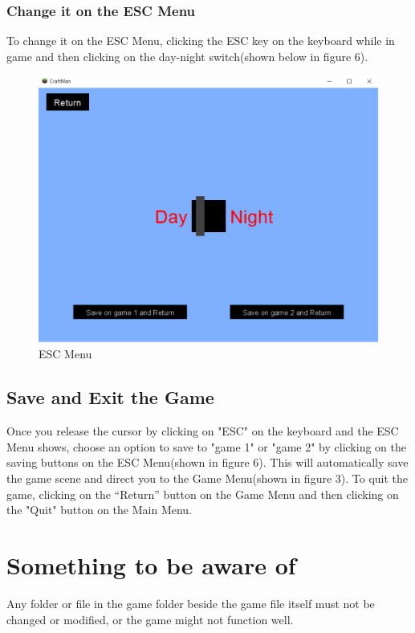 \documentclass[12pt, titlepage]{article}
\begin{document}
\subsubsection{Change it on the ESC Menu}
To change it on the ESC Menu, clicking the ESC key on the keyboard while in game and then clicking on the day-night switch(shown below in figure 6).
\FloatBarrier
\begin{figure}[h]
\centering
\includegraphics[scale=0.25]{ESCmenu}
\caption{ESC Menu}
\end{figure}
\FloatBarrier



\subsection{Save and Exit the Game}
Once you release the cursor by clicking on "ESC" on the keyboard and the ESC Menu shows, choose an option to save to "game 1" or "game 2" by clicking on the saving buttons on the ESC Menu(shown in figure 6). This will automatically save the game scene and direct you to the Game Menu(shown in figure 3). To quit the game, clicking on the “Return” button on the Game Menu and then clicking on the "Quit" button on the Main Menu.

\section{Something to be aware of}
Any folder or file in the game folder beside the game file itself must not be changed or modified, or the game might not function well.
\end{document}
